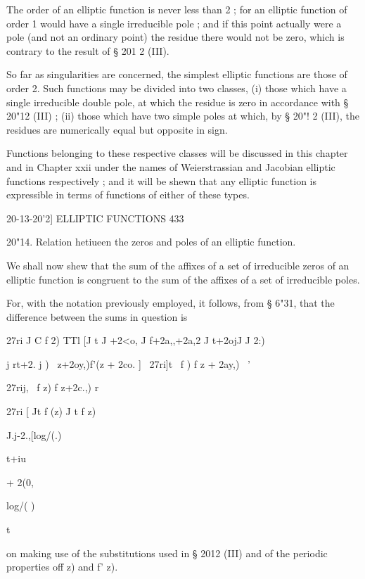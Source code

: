 The order of an elliptic function is never less than 2 ; for an
elliptic function of order 1 would have a single irreducible pole ;
and if this point actually were a pole (and not an ordinary point) the
residue there would not be zero, which is contrary to the result of §
201 2 (III).

So far as singularities are concerned, the simplest elliptic functions
are those of order 2. Such functions may be divided into two classes,
(i) those which have a single irreducible double pole, at which the
residue is zero in accordance with § 20"12 (III) ; (ii) those which
have two simple poles at which, by § 20"! 2 (III), the residues are
numerically equal but opposite in sign.

Functions belonging to these respective classes will be discussed in
this chapter and in Chapter xxii under the names of Weierstrassian and
Jacobian elliptic functions respectively ; and it will be shewn that
any elliptic function is expressible in terms of functions of either
of these types.



20-13-20'2] ELLIPTIC FUNCTIONS 433

20"14. Relation hetiueen the zeros and poles of an elliptic function.

We shall now shew that the sum of the affixes of a set of irreducible
zeros of an elliptic function is congruent to the sum of the affixes
of a set of irreducible poles.

For, with the notation previously employed, it follows, from § 6"31,
that the difference between the sums in question is

27ri J C f 2) TTl [J t J +2<o, J f+2a,,+2a,2 J t+2ojJ J 2:)

  j rt+2. j ) \ z+2oy,)f'(z + 2co. ] ~27ri]t \ f ) f z + 2ay,) \ '

27rij, \ f z) f z+2c.,) r

27ri [ Jt f (z) J t f z)



J.j-2.,[log/(.)



t+iu



+ 2(0,



log/( )



t



on making use of the substitutions used in § 2012 (III) and of the
periodic properties off z) and f' z).

